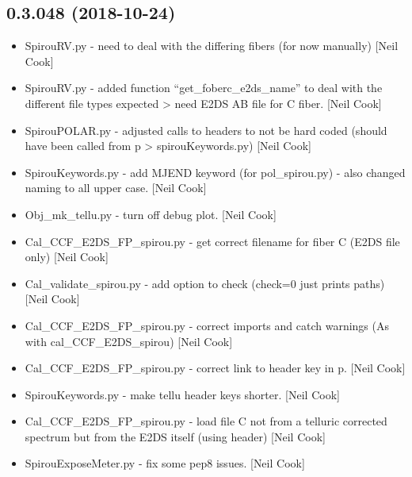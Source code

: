 \documentclass[a4paper,10pt,english]{report}
\begin{document}
\subsection{0.3.048 (2018-10-24)}
\label{\detokenize{misc/changelog:id282}}\begin{itemize}
\item {} 
SpirouRV.py - need to deal with the differing fibers (for now
manually) {[}Neil Cook{]}

\item {} 
SpirouRV.py - added function “get\_foberc\_e2ds\_name” to deal with the
different file types expected \textendash{}\textgreater{} need E2DS AB file for C fiber. {[}Neil
Cook{]}

\item {} 
SpirouPOLAR.py - adjusted calls to headers to not be hard coded
(should have been called from p \textendash{}\textgreater{} spirouKeywords.py) {[}Neil Cook{]}

\item {} 
SpirouKeywords.py - add MJEND keyword (for pol\_spirou.py) - also
changed naming to all upper case. {[}Neil Cook{]}

\item {} 
Obj\_mk\_tellu.py - turn off debug plot. {[}Neil Cook{]}

\item {} 
Cal\_CCF\_E2DS\_FP\_spirou.py - get correct filename for fiber C (E2DS
file only) {[}Neil Cook{]}

\item {} 
Cal\_validate\_spirou.py - add option to check (check=0 just prints
paths) {[}Neil Cook{]}

\item {} 
Cal\_CCF\_E2DS\_FP\_spirou.py - correct imports and catch warnings (As
with cal\_CCF\_E2DS\_spirou) {[}Neil Cook{]}

\item {} 
Cal\_CCF\_E2DS\_FP\_spirou.py - correct link to header key in p. {[}Neil
Cook{]}

\item {} 
SpirouKeywords.py - make tellu header keys shorter. {[}Neil Cook{]}

\item {} 
Cal\_CCF\_E2DS\_FP\_spirou.py - load file C not from a telluric corrected
spectrum but from the E2DS itself (using header) {[}Neil Cook{]}

\item {} 
SpirouExposeMeter.py - fix some pep8 issues. {[}Neil Cook{]}


\end{itemize}
\end{document}
